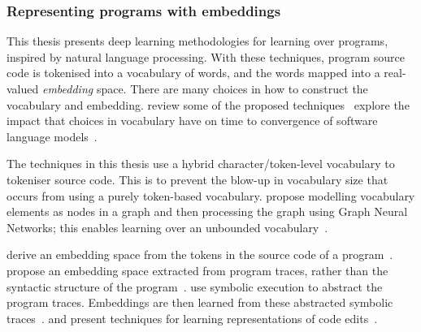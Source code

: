 \subsubsection{Representing programs with embeddings}

This thesis presents deep learning methodologies for learning over programs, inspired by natural language processing. With these techniques, program source code is tokenised into a vocabulary of words, and the words mapped into a real-valued \emph{embedding} space.
There are many choices in how to construct the vocabulary and embedding. \citeauthor{Chen2019} review some of the proposed techniques~\cite{Chen2019}
\citeauthor{Babii} explore the impact that choices in vocabulary have on time to convergence of software language models~\cite{Babii}.

The techniques in this thesis use a hybrid character/token-level vocabulary to tokeniser source code. This is to prevent the blow-up in vocabulary size that occurs from using a purely token-based vocabulary. \citeauthor{Cvitkovic2018a} propose modelling vocabulary elements as nodes in a graph and then processing the graph using Graph Neural Networks; this enables learning over an unbounded vocabulary~\cite{Cvitkovic2018a}.

\citeauthor{Mou2016} derive an embedding space from the tokens in the source code of a program~\cite{Mou2016}.
\citeauthor{Wang2017d} propose an embedding space extracted from program traces, rather than the syntactic structure of the program~\cite{Wang2017d}.
\citeauthor{Henkel2018} use symbolic execution to abstract the program traces. Embeddings are then learned from these abstracted symbolic traces~\cite{Henkel2018}.
%
 \citeauthor{Yin2018} and \citeauthor{Tufano2019} present techniques for learning representations of code edits~\cite{Yin2018,Tufano2019}.

